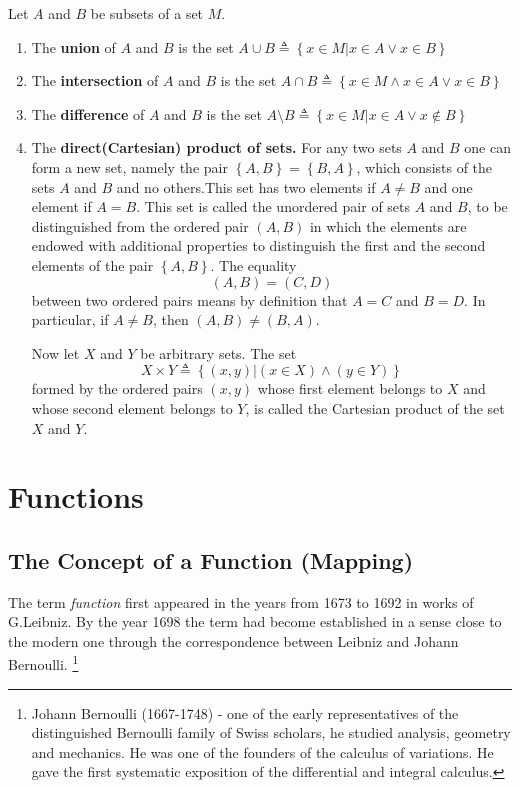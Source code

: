 \documentclass[a4paper,12pt]{article} %
\begin{document}
Let $A$ and $B$ be subsets of a set $M$.
\begin{enumerate}[label={\rm (\alph*)}]
    \item The {\color{red}\textbf{union}} of $A$ and $B$ is the set 
        $\displaystyle A \cup B \triangleq \left\{ x \in M \vert x \in A \vee x \in B \right\}$
    \item The {\color{red}\textbf{intersection}} of $A$ and $B$ is the set 
        $\displaystyle A \cap B \triangleq \left\{ x \in M \wedge x \in A \vee x \in B \right\}$
    \item The {\color{red}\textbf{difference}} of $A$ and $B$ is the set 
        $\displaystyle A \setminus B \triangleq \left\{ x \in M \vert x \in A \vee x \notin B \right\}$
    \item The {\color{red}\textbf{direct(Cartesian) product of sets.}}
        For any two sets $A$ and $B$ one can form a new set, namely 
        the pair $\left\{A, B\right\} = \left\{B, A\right\}$, which consists of the sets 
        $A$ and $B$ and no others.This set has two elements if $A \ne B$ and 
        one element if $A = B.$
        This set is called the unordered pair of sets $A$ and $B$, to 
        be distinguished from the ordered pair $(A, B)$ in which 
        the elements are endowed with additional properties to 
        distinguish the first and the second elements of the pair 
        $\left\{A, B\right\}$. The equality 
        \[
            (A, B) = (C, D)
            \]
        between two ordered pairs means by definition that $A = C$ 
        and $B = D$. In particular, if $A \ne B$, then $(A, B) \ne (B, A)$.

        Now let $X$ and $Y$ be arbitrary sets. The set 
        \[
            X \times Y \triangleq \left\{(x, y) \vert (x \in X) \wedge (y \in Y) \right\}
            \]
        formed by the ordered pairs $(x, y)$ whose first element belongs 
        to $X$ and whose second element belongs to $Y$, is called the 
        {\color{red} Cartesian product} of the set $X$  and $Y$.
\end{enumerate}

\section{Functions}
\subsection{The Concept of a Function (Mapping)}
The term \textit{function} first appeared in the years from 1673 to 1692 in
works of G.Leibniz. By the year 1698 the term had become established
in a sense close to the modern one through the correspondence 
between Leibniz and Johann Bernoulli.
\footnote{Johann Bernoulli (1667-1748) - one of the early representatives
of the distinguished Bernoulli family of Swiss scholars, he studied 
analysis, geometry and mechanics. He was one of the founders of the 
calculus of variations. He gave the first systematic exposition of 
the differential and integral calculus.}
\end{document}

